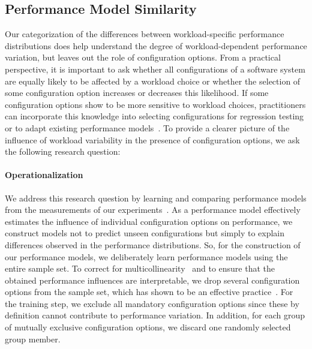 \subsection{Performance Model Similarity}\label{sec:rq2}
Our categorization of the differences between workload-specific performance distributions does help understand the degree of workload-dependent performance variation, but leaves out the role of configuration options. From a practical perspective, it is important to ask whether all configurations of a software system are equally likely to be affected by a workload choice or whether the selection of some configuration option increases or decreases this likelihood. If some configuration options show to be more sensitive to workload choices, practitioners can incorporate this knowledge into selecting configurations for regression testing or to adapt existing performance models~\cite{jamshidi_learning_2018}. To provide a clearer picture of the influence of workload variability in the presence of configuration options, we ask the following research question:


\paragraph*{Operationalization}
We address this research question by learning and comparing performance models from the measurements of our experiments~\cite{dorn2020,siegmundPerformanceinfluenceModelsHighly2015,haDeepPerf2019,perfAL,guoVariabilityawarePerformancePrediction2013,sarkarCostEfficientSamplingPerformance,guo_2018_data,fourier_learning_2015,perLasso}. As a performance model effectively estimates the influence of individual configuration options on performance, we construct models not to predict unseen configurations but simply to explain differences observed in the performance distributions. So, for the construction of our performance models, we deliberately learn performance models using the entire sample set. 
To correct for multicollinearity~\cite{Daoud_2017} and to ensure that the obtained performance influences are interpretable, we drop several configuration options from the sample set, which has shown to be an effective practice~\cite{dorn2020}. For the training step, we exclude all mandatory configuration options since these by definition cannot contribute to performance variation. In addition, for each group of mutually exclusive configuration options, we discard one randomly selected group member.


